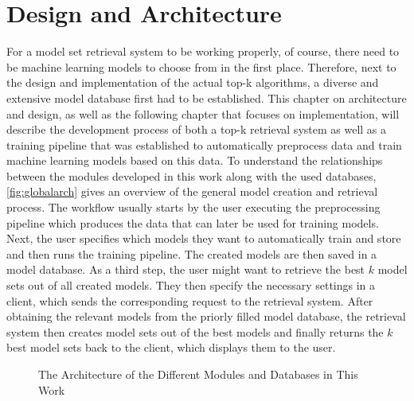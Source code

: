 \chapter{Design and Architecture} \label{chap:design}

For a model set retrieval system to be working properly, of course, there need to be machine learning models to choose from in the first place. Therefore, next to the design and implementation of the actual top-k algorithms, a diverse and extensive model database first had to be established. This chapter on architecture and design, as well as the following chapter that focuses on implementation, will describe the development process of both a top-k retrieval system as well as a training pipeline that was established to automatically preprocess data and train machine learning models based on this data. To understand the relationships between the modules developed in this work along with the used databases, \autoref{fig:globalarch} gives an overview of the general model creation and retrieval process. The workflow usually starts by the user executing the preprocessing pipeline which produces the data that can later be used for training models. Next, the user specifies which models they want to automatically train and store and then runs the training pipeline. The created models are then saved in a model database. As a third step, the user might want to retrieve the best $k$ model sets out of all created models. They then specify the necessary settings in a client, which sends the corresponding request to the retrieval system. After obtaining the relevant models from the priorly filled model database, the retrieval system then creates model sets out of the best models and finally returns the $k$ best model sets back to the client, which displays them to the user.

\begin{figure}[htbp]

  \caption{The Architecture of the Different Modules and Databases in This Work}
  \label{fig:globalarch}
\end{figure}

